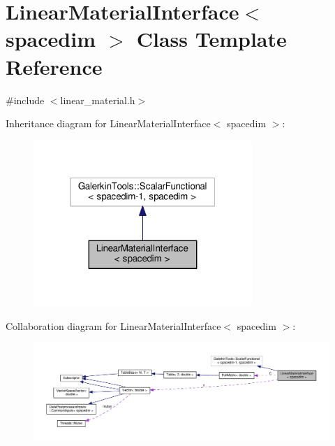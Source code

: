\hypertarget{class_linear_material_interface}{}\section{Linear\+Material\+Interface$<$ spacedim $>$ Class Template Reference}
\label{class_linear_material_interface}


{\ttfamily \#include $<$linear\+\_\+material.\+h$>$}



Inheritance diagram for Linear\+Material\+Interface$<$ spacedim $>$\+:\nopagebreak
\begin{figure}[H]
\begin{center}
\leavevmode
\includegraphics[width=235pt]{class_linear_material_interface__inherit__graph}
\end{center}
\end{figure}


Collaboration diagram for Linear\+Material\+Interface$<$ spacedim $>$\+:\nopagebreak
\begin{figure}[H]
\begin{center}
\leavevmode
\includegraphics[width=350pt]{class_linear_material_interface__coll__graph}
\end{center}
\end{figure}
